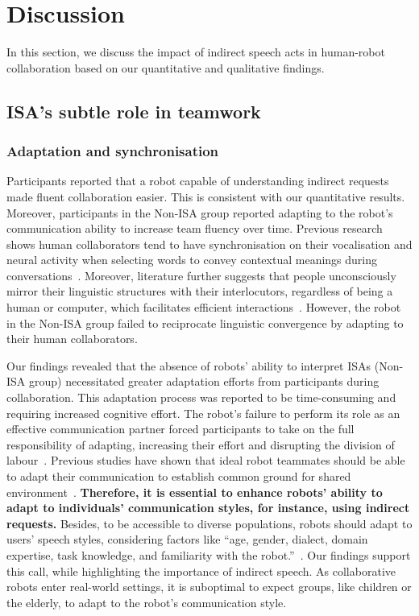 \section{Discussion}
In this section, we discuss the impact of indirect speech acts in human-robot collaboration based on our quantitative and qualitative findings. 

\subsection{ISA's subtle role in teamwork}
\subsubsection{Adaptation and synchronisation}
Participants reported that a robot capable of understanding indirect requests made fluent collaboration easier. This is consistent with our quantitative results. Moreover, participants in the Non-ISA group reported adapting to the robot's communication ability to increase team fluency over time. Previous research shows human collaborators tend to have synchronisation on their vocalisation and neural activity when selecting words to convey contextual meanings during conversations~\cite{abney2021cooperation, zada2024shared}. Moreover, literature further suggests that people unconsciously mirror their linguistic structures with their interlocutors, regardless of being a human or computer, which facilitates efficient interactions~\cite{branigan2010linguistic}. However, the robot in the Non-ISA group failed to reciprocate linguistic convergence by adapting to their human collaborators.

Our findings revealed that the absence of robots' ability to interpret ISAs (Non-ISA group) necessitated greater adaptation efforts from participants during collaboration. This adaptation process was reported to be time-consuming and requiring increased cognitive effort. The robot's failure to perform its role as an effective communication partner forced participants to take on the full responsibility of adapting, increasing their effort and disrupting the division of labour~\cite{clark1996using, dale1995computational}. Previous studies have shown that ideal robot teammates should be able to adapt their communication to establish common ground for shared environment~\cite{chai2016collaborative}. \textbf{Therefore, it is essential to enhance robots’ ability to adapt to individuals' communication styles, for instance, using indirect requests.} Besides, to be accessible to diverse populations, robots should adapt to users’ speech styles, considering factors like ``age, gender, dialect, domain expertise, task knowledge, and familiarity with the robot.''~\cite{marge2022spoken}. Our findings support this call, while highlighting the importance of indirect speech. As collaborative robots enter real-world settings, it is suboptimal to expect groups, like children or the elderly, to adapt to the robot's communication style. 

